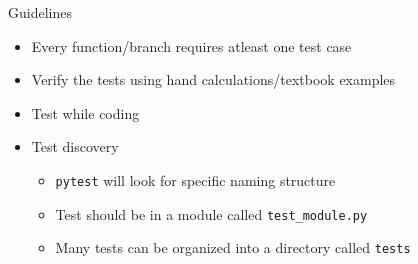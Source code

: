 \documentclass[11pt,professionalfonts]{beamer}
\begin{document}
\begin{frame}{Guidelines}
    \begin{itemize}
        \item Every function/branch requires atleast one test case
        \item Verify the tests using hand calculations/textbook examples
        \item Test while coding
        \item Test discovery
            \begin{itemize}
                \item \texttt{pytest} will look for specific naming structure
                \item Test should be in a module called \texttt{test\_module.py}
                \item Many tests can be organized into a directory called \texttt{tests}
            \end{itemize}
    \end{itemize}
\end{frame}
\end{document}
